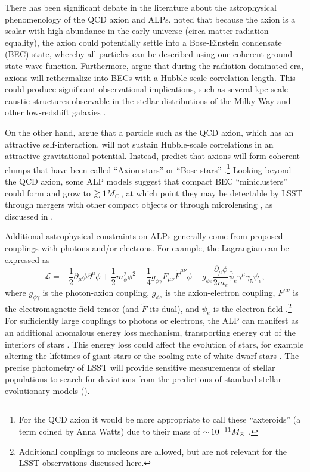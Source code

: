 There has been significant debate in the literature about the astrophysical phenomenology of the QCD axion and ALPs.
\citet{Sikivie:2009} noted that because the axion is a scalar with high abundance in the early universe (circa matter-radiation equality), the axion could potentially settle into a Bose-Einstein condensate (BEC) state, whereby all particles can be described using one coherent ground state wave function. 
Furthermore, \citet{Sikivie:2009} argue that during the radiation-dominated era, axions will rethermalize into BECs with a Hubble-scale correlation length.
This could produce significant observational implications, such as several-kpc-scale caustic structures observable in the stellar distributions of the Milky Way and other low-redshift galaxies \citep[\eg,][]{Natarajan:2006,0805.4556,Rindler-Daller:2013zxa}.

On the other hand, \citet{1412.5930} argue that a particle such as the QCD axion, which has an attractive self-interaction, will not sustain Hubble-scale correlations in an attractive gravitational potential.
Instead, \citet{1412.5930} predict that axions will form coherent clumps that have been called ``Axion stars'' or ``Bose stars'' \citep[\eg][]{Kolb:1993}.\footnote{For the QCD axion it would be more appropriate to call these ``axteroids'' (a term coined by Anna Watts) due to their mass of $ {\sim}\, 10^{-11} M_\odot$ \citep{Tkachev:1991ka,Braaten:2018nag}.} 
Looking beyond the QCD axion, some ALP models suggest that compact BEC ``miniclusters'' could form and grow to $\gtrsim 1M_\odot$, at which point they may be detectable by LSST through mergers with other compact objects \citep{1808.04746} or through microlensing \citep{1707.03310}, as discussed in .

Additional astrophysical constraints on ALPs generally come from proposed couplings with photons and/or electrons. 
For example, the Lagrangian can be expressed as
\begin{equation}
    \mathcal{L} = -\frac{1}{2} \partial_\mu\phi\partial^\mu\phi + \frac{1}{2}m_\phi^2 \phi^2 - \frac{1}{4}g_{\phi\gamma}F_{\mu\nu}\tilde{F}^{\mu\nu}\phi - g_{\phi e}\frac{\partial_\mu\phi}{2m_e}\bar{\psi}_e \gamma^\mu\gamma_5\psi_e,
\end{equation}
where $g_{\phi\gamma}$ is the photon-axion coupling, $g_{\phi e}$ is the axion-electron coupling, $F^{\mu\nu}$ is the electromagnetic field tensor (and $\tilde{F}$ its dual), and $\psi_e$ is the electron field \citep[\eg][]{1302.6283,Redondo:2013wwa}.\footnote{Additional couplings to nucleons are allowed, but are not relevant for the LSST observations discussed here.}
For sufficiently large couplings to photons or electrons, the ALP can manifest as an additional anomalous energy loss mechanism, transporting energy out of the interiors of stars \citep[\eg,][]{Raffelt:1990}.
This energy loss could affect the evolution of stars, for example altering the lifetimes of giant stars \citep{Ayala:2014,Viaux:2013hca,Viaux:2013lha} or the cooling rate of white dwarf stars \citep{Isern:2008nt}.
The precise photometry of LSST will provide sensitive measurements of stellar populations to search for deviations from the predictions of standard stellar evolutionary models ().

